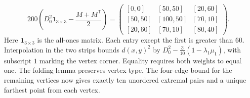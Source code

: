 \documentclass[11pt,letterpaper]{article}
\newcommand{\1}{\mathbf 1}
\begin{document}
\[
 200\left(D_0^2\mathbf{1}_{3\times3}-\frac{M+M^{\mathsf T}}2\right)=
 \begin{pmatrix}
 [0,0]&[50,50]&[20,60]\\
 [50,50]&[100,50]&[70,10]\\
 [20,60]&[70,10]&[80,40]
 \end{pmatrix}.
\]
Here $\mathbf{1}_{3\times3}$ is the all-ones matrix. Each entry except the first is greater than $60$. Interpolation in the two strips bounds $d(x,y)^2$ by $D_0^2-\frac3{10}(1-\lambda_1\mu_1)$, with subscript $1$ marking the vertex corner. Equality requires both weights to equal one. The folding lemma preserves vertex type. The four-edge bound for the remaining vertices now gives exactly ten unordered extremal pairs and a unique farthest point from each vertex.


\end{document}

